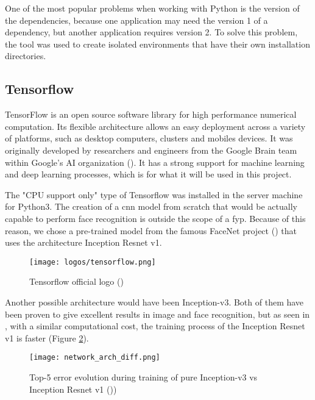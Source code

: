 	One of the most popular problems when working with Python is the version of the dependencies, because one application may need the version 1 of a dependency, but another application requires version 2. To solve this problem, the \cite{virtualenv} tool was used to create isolated environments that have their own installation directories.  

	\subsection{Tensorflow}
	TensorFlow is an open source software library for high performance numerical computation. Its flexible architecture allows an easy deployment across a variety of platforms, such as desktop computers, clusters and mobiles devices. It was originally developed by researchers and engineers from the Google Brain team within Google’s AI organization (\cite{tensorflow_main_website}). It has a strong support for machine learning and deep learning processes, which is for what it will be used in this project. 

	The "CPU support only" type of Tensorflow was installed in the server machine for Python3. The creation of a \gls{cnn} model from scratch that would be actually capable to perform face recognition is outside the scope of a \gls{fyp}. Because of this reason, we chose a pre-trained model from the famous FaceNet project (\cite{facenet_article}) that uses the architecture Inception Resnet v1.

	\clearpage

	\begin{figure}[!ht]
		\centering
		\texttt{[image: logos/tensorflow.png]}
		\caption{Tensorflow official logo (\cite{tensorflow_main_website})}
		\label{fig:tensorflow}
	\end{figure}

	Another possible architecture would have been Inception-v3. Both of them have been proven to give excellent results in image and face recognition, but as seen in \cite{inception_resnet_article}, with a similar computational cost, the training process of the Inception Resnet v1 is faster (Figure \ref{fig:incep_arch_diff}).

	\begin{figure}[!ht]
		\centering
		\texttt{[image: network\_arch\_diff.png]}
		\caption{Top-5 error evolution during training of pure Inception-v3 vs Inception Resnet v1 (\cite{inception_resnet_article}))}
		\label{fig:incep_arch_diff}
	\end{figure}

